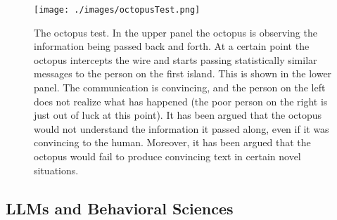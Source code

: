 \begin{figure}[ht]
\centering
\texttt{[image: ./images/octopusTest.png]}
\caption[Soraya Boza.]{The octopus test. In the upper panel the octopus is
observing the information being passed back and forth. At a certain point the
octopus intercepts the wire and starts passing statistically similar messages
to the person on the first island. This is shown in the lower panel. The
communication is convincing, and the person on the left does not realize what
has happened (the poor person on the right is just out of luck at this point).
It has been argued that the octopus would not understand the information it
passed along, even if it was convincing to the human. Moreover, it has been
argued that the octopus would fail to produce convincing text in certain novel
situations.
}
\label{octopusTest}
\end{figure}


\subsection{LLMs and Behavioral Sciences}\label{llmsBehavioral}


